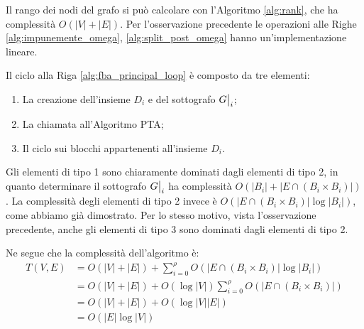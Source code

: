 \begin{proof2}
    Il rango dei nodi del grafo si può calcolare con l'Algoritmo \ref{alg:rank}, che ha complessità $O(|V|+|E|)$. Per l'osservazione precedente le operazioni alle Righe \ref{alg:impunemente_omega}, \ref{alg:split_post_omega} hanno un'implementazione lineare.

    Il ciclo alla Riga \ref{alg:fba_principal_loop} è composto da tre elementi:
    \begin{enumerate}
        \item La creazione dell'insieme $D_i$ e del sottografo $\restr{G}{i}$;
        \item La chiamata all'Algoritmo PTA;
        \item Il ciclo sui blocchi appartenenti all'insieme $D_i$.
    \end{enumerate}
    Gli elementi di tipo 1 sono chiaramente dominati dagli elementi di tipo 2, in quanto determinare il sottografo $\restr{G}{i}$ ha complessità $O(|B_i| + |E \cap (B_i \times B_i)|)$. La complessità degli elementi di tipo 2 invece è $O(|E \cap (B_i \times B_i)| \log |B_i|)$, come abbiamo già dimostrato.  Per lo stesso motivo, vista l'osservazione precedente, anche gli elementi di tipo 3 sono dominati dagli elementi di tipo 2.

    Ne segue che la complessità dell'algoritmo è:
    \begin{align*}
        T(V,E) &= O(|V| + |E|) + \sum_{i=0}^\rho O(|E \cap (B_i \times B_i)| \log |B_i|)\\
        &= O(|V| + |E|) +  O(\log |V|) \sum_{i=0}^\rho O(|E \cap (B_i \times B_i)|)\\
        &= O(|V| + |E|) +  O(\log |V| |E|)\\
        &= O(|E| \log |V|)
    \end{align*}
\end{proof2}
